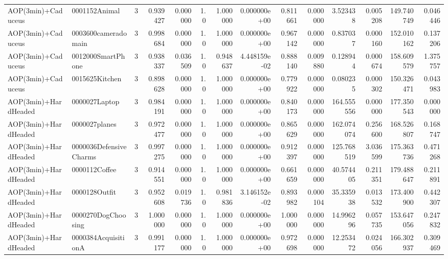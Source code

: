 \begin{tabular}{llrr|r|rr|rr|rr|rrr}
       AOP(3min)+Caduceus &          0001152Animal &       3 & 0.939427 & 0.000000 &  1.0 &      1.000000 & 0.000000e+00 &      0.811661 & 0.000000 &      3.523438 &    0.005208 &   149.740749 &    0.046446 \\
       AOP(3min)+Caduceus &    0003600cameradomain &       3 & 0.998684 & 0.000000 &  1.0 &      1.000000 & 0.000000e+00 &      0.967142 & 0.000000 &      0.837037 &    0.000160 &   152.010162 &    0.137206 \\
       AOP(3min)+Caduceus &      0012000SmartPhone &       3 & 0.938337 & 0.036509 &  1.0 &      0.948637 & 4.448159e-02 &      0.888140 & 0.009880 &      0.128944 &    0.000674 &   158.609579 &    1.375757 \\
       AOP(3min)+Caduceus &         0015625Kitchen &       3 & 0.898628 & 0.000000 &  1.0 &      1.000000 & 0.000000e+00 &      0.779922 & 0.000000 &      0.080235 &    0.000302 &   150.326471 &    0.043983 \\
     AOP(3min)+HardHeaded &          0000027Laptop &       3 & 0.984191 & 0.000000 &  1.0 &      1.000000 & 0.000000e+00 &      0.840173 & 0.000000 &    164.555556 &    0.000000 &   177.350543 &    0.000000 \\
     AOP(3min)+HardHeaded &          0000027planes &       3 & 0.972477 & 0.000000 &  1.0 &      1.000000 & 0.000000e+00 &      0.865629 & 0.000000 &    162.074074 &    0.256600 &   168.526807 &    0.168747 \\
     AOP(3min)+HardHeaded & 0000036DefensiveCharms &       3 & 0.997275 & 0.000000 &  1.0 &      1.000000 & 0.000000e+00 &      0.912397 & 0.000000 &    125.768519 &    3.036599 &   175.363736 &    0.471268 \\
     AOP(3min)+HardHeaded &          0000112Coffee &       3 & 0.914551 & 0.000000 &  1.0 &      1.000000 & 0.000000e+00 &      0.661659 & 0.000000 &     40.574405 &    0.211351 &   179.488647 &    0.211891 \\
     AOP(3min)+HardHeaded &          0000128Outfit &       3 & 0.952608 & 0.019736 &  1.0 &      0.981836 & 3.146152e-02 &      0.893982 & 0.000104 &     35.335938 &    0.013532 &   173.400900 &    0.442307 \\
     AOP(3min)+HardHeaded &     0000270DogChoosing &       3 & 1.000000 & 0.000000 &  1.0 &      1.000000 & 0.000000e+00 &      1.000000 & 0.000000 &     14.996296 &    0.057735 &   153.647056 &    0.247832 \\
     AOP(3min)+HardHeaded &    0000384AcquisitionA &       3 & 0.991177 & 0.000000 &  1.0 &      1.000000 & 0.000000e+00 &      0.972698 & 0.000000 &     12.253472 &    0.024056 &   166.302937 &    0.309469 \\

\end{tabular}
